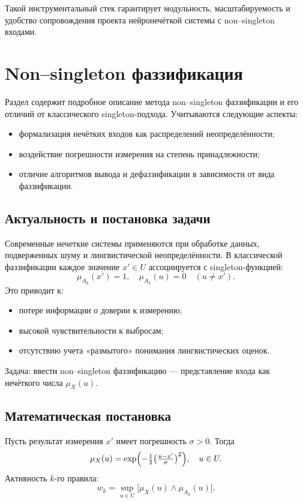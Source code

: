 Такой инструментальный стек гарантирует модульность, масштабируемость
и удобство сопровождения проекта нейронечёткой системы
с non–singleton входами.


\section{Non–singleton фаззификация}
\label{sec:nsi_phase}

Раздел содержит подробное описание метода non–singleton фаззификации и его отличий от классического singleton-подхода. Учитываются следующие аспекты:
\begin{itemize}
  \item формализация нечётких входов как распределений неопределённости;
  \item воздействие погрешности измерения на степень принадлежности;
  \item отличие алгоритмов вывода и дефаззификации в зависимости от вида фаззификации.
\end{itemize}

\subsection{Актуальность и постановка задачи}
Современные нечеткие системы применяются при обработке данных, подверженных шуму и лингвистической неопределённости. В классической фаззификации каждое значение $x'\in U$ ассоциируется с singleton-функцией:
\[
  \mu_{A_k}(x')=1,\quad \mu_{A_k}(u)=0\quad (u\ne x').
\]
Это приводит к:
\begin{itemize}
  \item потере информации о доверии к измерению;
  \item высокой чувствительности к выбросам;
  \item отсутствию учета «размытого» понимания лингвистических оценок.
\end{itemize}
Задача: ввести non–singleton фаззификацию — представление входа как нечёткого числа $\mu_X(u)$.

\subsection{Математическая постановка}
Пусть результат измерения $x'$ имеет погрешность $\sigma>0$. Тогда
\[
  \mu_X(u)=\exp\Bigl(-\tfrac12\bigl(\tfrac{u-x'}{\sigma}\bigr)^2\Bigr),
  \quad u\in U.
\]
Активность $k$-го правила:
\[
  w_k=\sup_{u\in U}\bigl[\mu_X(u) \land \mu_{A_k}(u)\bigr].
\]


